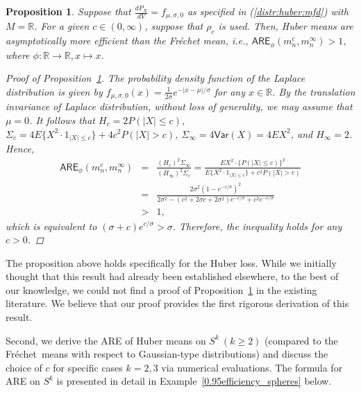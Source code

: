 \documentclass[preprint]{imsart}
\newcommand{\bbR}{\mathbb{R}}
\def\Frechet{Fr\'{e}chet}
\theoremstyle{plain}
\newtheorem{proposition}{Proposition}
\theoremstyle{remark}
\begin{document}
\begin{appendix}
\begin{proposition}\label{prop:M-type}
Suppose that $\frac{dP_{X}}{dV} = f_{\mu, \sigma, 0}$ as specified in (\ref{distr:huber:mfd}) with $M=\bbR$. For a given $c \in (0, \infty)$, suppose that $\rho_{c}$ is used. Then, Huber means are asymptotically more efficient than the Fréchet mean, i.e., $\textsf{ARE}_{\phi}(m^{c}_{n}, m^{\infty}_{n}) > 1$, where $\phi:\bbR \rightarrow \bbR, x \mapsto x$.
\begin{proof}[Proof of Proposition~\ref{prop:M-type}]
The probability density function of the Laplace distribution is given by $f_{\mu, \sigma, 0}(x) = \frac{1}{2\sigma} e^{-|x - \mu|/\sigma}$ for any $x \in \bbR$. By the translation invariance of Laplace distribution, without loss of generality, we may assume that $\mu=0$. It follows that $H_{c}=2P(|X| \le c)$, $\Sigma_{c}=4E\{X^2 \cdot 1_{|X| \le c}\} + 4c^2 P(|X| > c)$, $\Sigma_{\infty}=4\textsf{Var}(X) = 4EX^2$, and $H_{\infty}=2$. Hence, 
\begin{eqnarray*}
\textsf{ARE}_{\phi}(m^{c}_{n}, m^{\infty}_{n}) &=& \frac{(H_{c})^2 \Sigma_{\infty}}{(H_{\infty})^2 \Sigma_{c}} = \frac{EX^2 \cdot \{P(|X| \le c)\}^2}{E\{X^2 \cdot 1_{|X| \le c}\} + c^2P(|X| > c)} \\
&=& \frac{2\sigma^2(1-e^{-c/\sigma})^2}{2\sigma^2-(c^2 + 2\sigma c + 2\sigma^2)e^{-c/\sigma} + c^2e^{-c/\sigma}} \\
&>& 1,
\end{eqnarray*}
which is equivalent to $(\sigma + c)e^{c/\sigma} > \sigma$. Therefore, the inequality holds for any $c > 0$. 
\end{proof}
\end{proposition}

The proposition above holds specifically for the Huber loss.
While we initially thought that this result had already been established elsewhere, to the best of our knowledge, we could not find a proof of Proposition~\ref{prop:M-type} in the existing literature.
We believe that our proof provides the first rigorous derivation of this result.








Second, we derive the ARE of Huber means on $S^k ~ (k\ge2)$ (compared to the \Frechet\ means with respect to Gaussian-type distributions) and discuss the choice of $c$ for specific cases $k=2, 3$ via numerical evaluations. The formula for ARE on $S^k$ is presented in detail in Example~\ref{0.95efficiency_spheres} below. 



\end{appendix}
\end{document}
